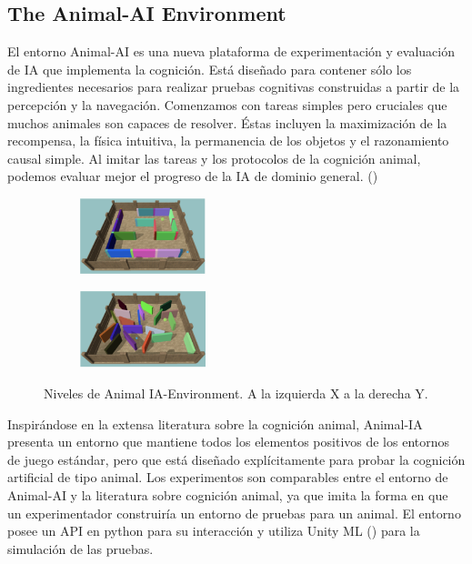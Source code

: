 \subsection{The Animal-AI Environment}

El entorno Animal-AI es una nueva plataforma de experimentación y evaluación de IA que implementa la cognición. Está diseñado para contener sólo los ingredientes necesarios para realizar pruebas cognitivas construidas a partir de la percepción y la navegación. Comenzamos con tareas simples pero cruciales que muchos animales son capaces de resolver. Éstas incluyen la maximización de la recompensa, la física intuitiva, la permanencia de los objetos y el razonamiento causal simple. Al imitar las tareas y los protocolos de la cognición animal, podemos evaluar mejor el progreso de la IA de dominio general. (\cite{beyret2019animal})

\begin{figure}[ht!]
    \centering
    \begin{subfigure}
      \centering
      \includegraphics[width=0.4\textwidth]{Graphics/animal_1.png}
      \label{fig:animal1}
    \end{subfigure}%
    \begin{subfigure}
      \centering
      \includegraphics[width=0.4\textwidth]{Graphics/animal_3.png}
      \label{fig:animal2}
    \end{subfigure}%
    \caption{Niveles de Animal IA-Environment. A la izquierda X a la derecha Y.}
    \label{fig:animal}
\end{figure}

Inspirándose en la extensa literatura sobre la cognición animal, Animal-IA presenta un entorno que mantiene todos los elementos positivos de los entornos de juego estándar, pero que está diseñado explícitamente para probar la cognición artificial de tipo animal. Los experimentos son comparables entre el entorno de Animal-AI y la literatura sobre cognición animal, ya que imita la forma en que un experimentador construiría un entorno de pruebas para un animal. El entorno posee un API en python para su interacción y utiliza Unity ML (\cite{juliani2018unity}) para la simulación de las pruebas.

